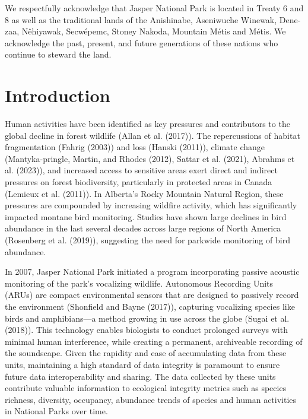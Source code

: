 \documentclass[
  letterpaper,
  DIV=11,
  numbers=noendperiod]{scrartcl}
\begin{document}
We respectfully acknowledge that Jasper National Park is located in
Treaty 6 and 8 as well as the traditional lands of the Anishinabe,
Aseniwuche Winewak, Dene-zaa, Nêhiyawak, Secwépemc, Stoney Nakoda,
Mountain Métis and Métis. We acknowledge the past, present, and future
generations of these nations who continue to steward the land.

\section{Introduction}\label{introduction}

Human activities have been identified as key pressures and contributors
to the global decline in forest wildlife (Allan et al. (2017)). The
repercussions of habitat fragmentation (Fahrig (2003)) and loss (Hanski
(2011)), climate change (Mantyka-pringle, Martin, and Rhodes (2012),
Sattar et al. (2021), Abrahms et al. (2023)), and increased access to
sensitive areas exert direct and indirect pressures on forest
biodiversity, particularly in protected areas in Canada (Lemieux et al.
(2011)). In Alberta's Rocky Mountain Natural Region, these pressures are
compounded by increasing wildfire activity, which has significantly
impacted montane bird monitoring. Studies have shown large declines in
bird abundance in the last several decades across large regions of North
America (Rosenberg et al. (2019)), suggesting the need for parkwide
monitoring of bird abundance.

In 2007, Jasper National Park initiated a program incorporating passive
acoustic monitoring of the park's vocalizing wildlife. Autonomous
Recording Units (ARUs) are compact environmental sensors that are
designed to passively record the environment (Shonfield and Bayne
(2017)), capturing vocalizing species like birds and amphibians---a
method growing in use across the globe (Sugai et al. (2018)). This
technology enables biologists to conduct prolonged surveys with minimal
human interference, while creating a permanent, archiveable recording of
the soundscape. Given the rapidity and ease of accumulating data from
these units, maintaining a high standard of data integrity is paramount
to ensure future data interoperability and sharing. The data collected
by these units contribute valuable information to ecological integrity
metrics such as species richness, diversity, occupancy, abundance trends
of species and human activities in National Parks over time.
\end{document}
